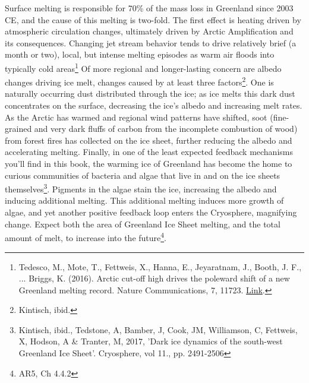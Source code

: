 Surface melting is responsible for 70\% of the mass loss in Greenland since 2003 CE, and the cause of this melting is two-fold. The first effect is heating driven by atmospheric circulation changes, ultimately driven by Arctic Amplification and its consequences. Changing jet stream behavior tends to drive relatively brief (a month or two), local, but intense melting episodes as warm air floods into typically cold areas\footnote{Tedesco, M., Mote, T., Fettweis, X., Hanna, E., Jeyaratnam, J., Booth, J. F., ... Briggs, K. (2016). Arctic cut-off high drives the poleward shift of a new Greenland melting record. Nature Communications, 7, 11723. \href{https://doi.org/10.1038/ncomms11723}{Link}.} Of more regional and longer-lasting concern are albedo changes driving ice melt, changes caused by at least three factors\footnote{Kintisch, ibid.}. One is naturally occurring dust distributed through the ice; as ice melts this dark dust concentrates on the surface, decreasing the ice's albedo and increasing melt rates. As the Arctic has warmed and regional wind patterns have shifted, soot (fine-grained and very dark fluffs of carbon from the incomplete combustion of wood) from forest fires has collected on the ice sheet, further reducing the albedo and accelerating melting. Finally, in one of the least expected feedback mechanisms you'll find in this book, the warming ice of Greenland has become the home to curious communities of bacteria and algae that live in and on the ice sheets themselves\footnote{Kintisch, ibid., Tedstone, A, Bamber, J, Cook, JM, Williamson, C, Fettweis, X, Hodson, A \& Tranter, M, 2017, 'Dark ice dynamics of the south-west Greenland Ice Sheet'. Cryosphere, vol 11., pp. 2491-2506}. Pigments in the algae stain the ice, increasing the albedo and inducing additional melting. This additional melting induces more growth of algae, and yet another positive feedback loop enters the Cryosphere, magnifying change. Expect both the area of Greenland Ice Sheet melting, and the total amount of melt, to increase into the future\footnote{AR5, Ch 4.4.2}. \\
